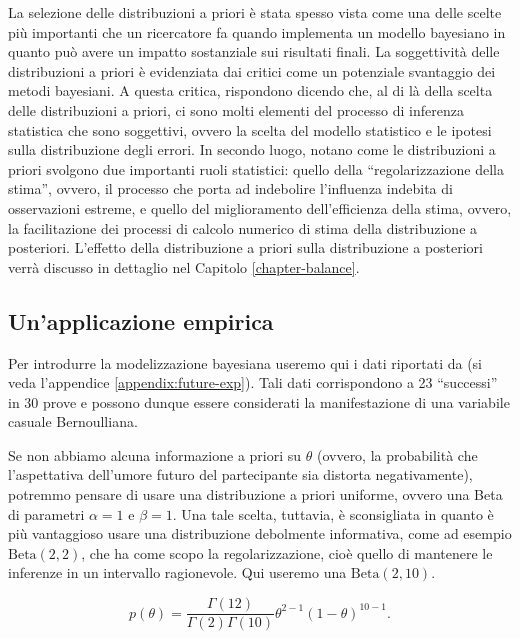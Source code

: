 \documentclass[
  11pt,
]{krantz}
\theoremstyle{definition}
\theoremstyle{definition}
\theoremstyle{definition}
\theoremstyle{definition}
\theoremstyle{remark}
\begin{document}
La selezione delle distribuzioni a priori è stata spesso vista come una delle scelte più importanti che un ricercatore fa quando implementa un modello bayesiano in quanto può avere un impatto sostanziale sui risultati finali. La soggettività delle distribuzioni a priori è evidenziata dai critici come un potenziale svantaggio dei metodi bayesiani. A questa critica, \citet{vandeSchoot2021modelling} rispondono dicendo che, al di là della scelta delle distribuzioni a priori, ci sono molti elementi del processo di inferenza statistica che sono soggettivi, ovvero la scelta del modello statistico e le ipotesi sulla distribuzione degli errori. In secondo luogo, \citet{vandeSchoot2021modelling} notano come le distribuzioni a priori svolgono due importanti ruoli statistici: quello della ``regolarizzazione della stima'', ovvero, il processo che porta ad indebolire l'influenza indebita di osservazioni estreme, e quello del miglioramento dell'efficienza della stima, ovvero, la facilitazione dei processi di calcolo numerico di stima della distribuzione a posteriori. L'effetto della distribuzione a priori sulla distribuzione a posteriori verrà discusso in dettaglio nel Capitolo \ref{chapter-balance}.

\hypertarget{unapplicazione-empirica}{%
\subsection{Un'applicazione empirica}\label{unapplicazione-empirica}}

Per introdurre la modelizzazione bayesiana useremo qui i dati riportati da \citet{zetschefuture2019} (si veda l'appendice \ref{appendix:future-exp}). Tali dati corrispondono a 23 ``successi'' in 30 prove e possono dunque essere considerati la manifestazione di una variabile casuale Bernoulliana.

Se non abbiamo alcuna informazione a priori su \(\theta\) (ovvero, la probabilità che l'aspettativa dell'umore futuro del partecipante sia distorta negativamente), potremmo pensare di usare una distribuzione a priori uniforme, ovvero una Beta di parametri \(\alpha=1\) e \(\beta=1\). Una tale scelta, tuttavia, è sconsigliata in quanto è più vantaggioso usare una distribuzione debolmente informativa, come ad esempio \(\mbox{Beta}(2, 2)\), che ha come scopo la regolarizzazione, cioè quello di mantenere le inferenze in un intervallo ragionevole. Qui useremo una \(\mbox{Beta}(2, 10)\).

\[
p(\theta) = \frac{\Gamma(12)}{\Gamma(2)\Gamma(10)}\theta^{2-1} (1-\theta)^{10-1}.
\]
\end{document}
